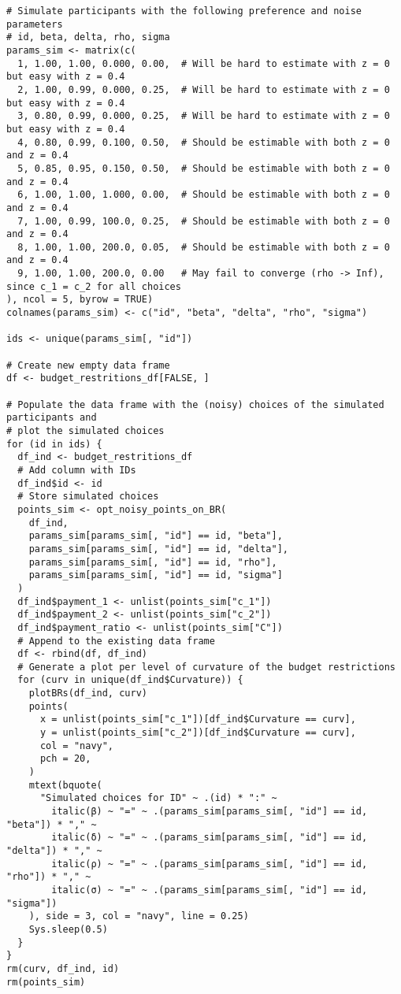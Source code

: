 \documentclass[12pt, a4paper, oneside]{article}
\theoremstyle{Plain}
\theoremstyle{Definition}
\theoremstyle{Remark}
\begin{document}
\begin{appendix}
\begin{lstlisting}
# Simulate participants with the following preference and noise parameters
# id, beta, delta, rho, sigma
params_sim <- matrix(c(
  1, 1.00, 1.00, 0.000, 0.00,  # Will be hard to estimate with z = 0 but easy with z = 0.4
  2, 1.00, 0.99, 0.000, 0.25,  # Will be hard to estimate with z = 0 but easy with z = 0.4
  3, 0.80, 0.99, 0.000, 0.25,  # Will be hard to estimate with z = 0 but easy with z = 0.4
  4, 0.80, 0.99, 0.100, 0.50,  # Should be estimable with both z = 0 and z = 0.4
  5, 0.85, 0.95, 0.150, 0.50,  # Should be estimable with both z = 0 and z = 0.4
  6, 1.00, 1.00, 1.000, 0.00,  # Should be estimable with both z = 0 and z = 0.4
  7, 1.00, 0.99, 100.0, 0.25,  # Should be estimable with both z = 0 and z = 0.4
  8, 1.00, 1.00, 200.0, 0.05,  # Should be estimable with both z = 0 and z = 0.4
  9, 1.00, 1.00, 200.0, 0.00   # May fail to converge (rho -> Inf), since c_1 = c_2 for all choices
), ncol = 5, byrow = TRUE)
colnames(params_sim) <- c("id", "beta", "delta", "rho", "sigma")

ids <- unique(params_sim[, "id"])

# Create new empty data frame
df <- budget_restritions_df[FALSE, ]

# Populate the data frame with the (noisy) choices of the simulated participants and
# plot the simulated choices
for (id in ids) {
  df_ind <- budget_restritions_df
  # Add column with IDs
  df_ind$id <- id
  # Store simulated choices
  points_sim <- opt_noisy_points_on_BR(
    df_ind,
    params_sim[params_sim[, "id"] == id, "beta"],
    params_sim[params_sim[, "id"] == id, "delta"],
    params_sim[params_sim[, "id"] == id, "rho"],
    params_sim[params_sim[, "id"] == id, "sigma"]
  )
  df_ind$payment_1 <- unlist(points_sim["c_1"])
  df_ind$payment_2 <- unlist(points_sim["c_2"])
  df_ind$payment_ratio <- unlist(points_sim["C"])
  # Append to the existing data frame
  df <- rbind(df, df_ind)
  # Generate a plot per level of curvature of the budget restrictions
  for (curv in unique(df_ind$Curvature)) {
    plotBRs(df_ind, curv)
    points(
      x = unlist(points_sim["c_1"])[df_ind$Curvature == curv],
      y = unlist(points_sim["c_2"])[df_ind$Curvature == curv],
      col = "navy",
      pch = 20,
    )
    mtext(bquote(
      "Simulated choices for ID" ~ .(id) * ":" ~
        italic(β) ~ "=" ~ .(params_sim[params_sim[, "id"] == id, "beta"]) * "," ~
        italic(δ) ~ "=" ~ .(params_sim[params_sim[, "id"] == id, "delta"]) * "," ~
        italic(ρ) ~ "=" ~ .(params_sim[params_sim[, "id"] == id, "rho"]) * "," ~
        italic(σ) ~ "=" ~ .(params_sim[params_sim[, "id"] == id, "sigma"])
    ), side = 3, col = "navy", line = 0.25)
    Sys.sleep(0.5)
  }
}
rm(curv, df_ind, id)
rm(points_sim)





\end{lstlisting}
\end{appendix}
\end{document}
